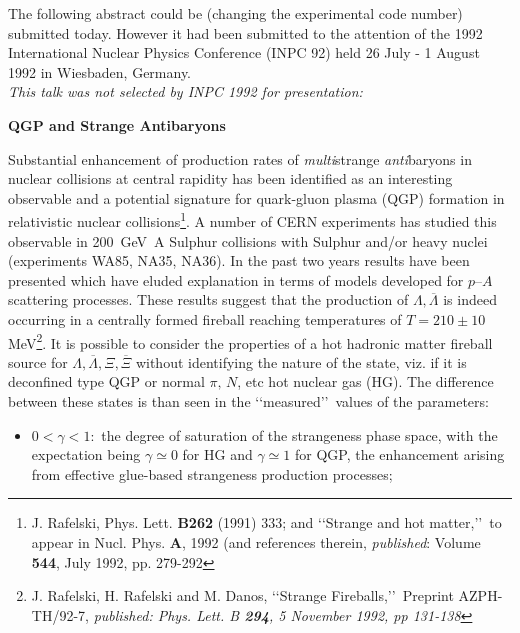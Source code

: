The following abstract could be (changing the experimental code number)  submitted today. However it had been submitted to the attention of the 1992 International Nuclear Physics Conference (INPC 92) held 26 July - 1 August 1992 in Wiesbaden, Germany.\\

\noindent\textit{This talk was not selected by INPC 1992 for presentation:}\\[-0.7cm]
%
\begin{mdframed}[linecolor=gray,roundcorner=12pt,backgroundcolor=Dandelion!15,linewidth=1pt,leftmargin=0cm,rightmargin=0cm,topline=true,bottomline=true,skipabove=12pt]\relax%
%
\begin{center}
{\bf QGP and Strange Antibaryons} 
\end{center}

Substantial enhancement of production rates of {\it multi}strange {\it anti}baryons in nuclear collisions at central rapidity has been identified as an interesting observable and a potential signature for quark-gluon plasma (QGP) formation in relativistic nuclear collisions\footnote{J. Rafelski, Phys. Lett. {\bf B262} (1991) 333; and \lq\lq Strange and hot matter,\rq\rq\ to appear in Nucl. Phys. {\bf A}, 1992 (and references therein, \textit{published}: Volume \textbf{544}, July 1992, pp. 279-292}. A number of CERN experiments has studied this observable in 200~GeV~A Sulphur collisions with Sulphur and/or heavy nuclei (experiments WA85, NA35, NA36). In the past two years results have been presented which have eluded explanation in terms of models developed for $p$--$A$ scattering processes. These results suggest that the production of $\Lambda, \overline{\Lambda}$ is indeed occurring in a centrally formed fireball reaching temperatures of $T=210\pm10$ MeV\footnote{J. Rafelski, H. Rafelski and M. Danos, \lq\lq Strange Fireballs,\rq\rq\ Preprint AZPH-TH/92-7, \textit{published: Phys. Lett. B \textbf{294}, 5 November 1992, pp 131-138}}. It is possible to consider the properties of a hot hadronic matter fireball source for
$\Lambda, \overline{\Lambda}, \Xi, \overline{\Xi}$ without identifying the nature of the state, viz. if it is deconfined type QGP or normal $\pi,\,N$, etc hot nuclear gas (HG). The difference between these states is than seen in the \lq\lq measured\rq\rq\ values of the parameters:
\begin{itemize}
\item $0<\gamma<1:$ the degree of saturation of the strangeness phase space, with the expectation being $\gamma\simeq 0$ for HG and $\gamma\simeq 1$ for QGP, the enhancement arising from effective glue-based strangeness production processes;

\end{itemize}
\end{mdframed}
